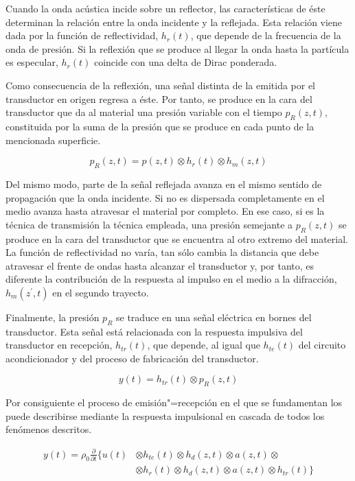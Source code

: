 Cuando la onda acústica incide sobre un reflector, las características de
éste determinan la relación entre la onda incidente y la reflejada. Esta
relación viene dada por la función de reflectividad, $h_r(t)$, que depende
de la frecuencia de la onda de presión. Si la reflexión que se produce al
llegar la onda hasta la partícula es especular, $h_r(t)$ coincide con una
delta de Dirac ponderada.

Como consecuencia de la reflexión, una señal distinta de la emitida por el
transductor en origen regresa a éste. Por tanto, se produce en la cara del
transductor que da al material una presión variable con el tiempo $p_R(z,
t)$, constituida por la suma de la presión que se produce en cada punto de
la mencionada superficie.

\begin{equation}
	p_R(z, t) = p(z, t)\otimes h_r(t)\otimes h_m(z, t)
	\label{eq:recpressure}
\end{equation}

Del mismo modo, parte de la señal reflejada avanza en el mismo sentido de
propagación que la onda incidente. Si no es dispersada completamente en el
medio avanza hasta atravesar el material por completo. En ese caso, si es
la técnica de transmisión la técnica empleada, una presión semejante a
$p_R(z, t)$ se produce en la cara del transductor que se encuentra al otro
extremo del material. La función de reflectividad no varía, tan sólo cambia
la distancia que debe atravesar el frente de ondas hasta alcanzar el
transductor y, por tanto, es diferente la contribución de la respuesta al
impulso en el medio a la difracción, $h_m(z^\prime, t)$ en el segundo
trayecto.

Finalmente, la presión $p_R$ se traduce en una señal eléctrica en bornes
del transductor. Esta señal está relacionada con la respuesta impulsiva del
transductor en recepción, $h_{tr}(t)$, que depende, al igual que
$h_{te}(t)$ del circuito acondicionador y del proceso de fabricación del
transductor.

\begin{equation}
	y(t) = h_{tr}(t)\otimes p_R(z, t)
	\label{eq:receiver}
\end{equation}

Por consiguiente el proceso de emisión"=recepción en el que se fundamentan
los  puede describirse mediante la respuesta impulsional en
cascada de todos los fenómenos descritos.

\begin{equation}\label{eq:emirec}
	\begin{split}
		y(t) = \rho_0\frac{\partial}{\partial t}\{u(t)& \otimes
		h_{te}(t)\otimes h_d(z, t)\otimes a(z, t)\otimes \\
		&\otimes h_r(t)\otimes h_d(z, t)\otimes a(z, t)\otimes
		h_{tr}(t)\}
	\end{split}
\end{equation}

